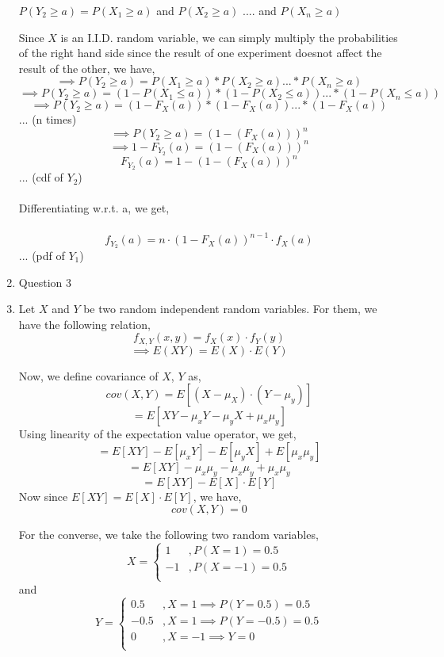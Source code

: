 \documentclass[11pt]{article}
\begin{document}
\begin{enumerate}
{		\begin{center}
			$P(Y_2 \geq a) = P(X_1 \geq a) $ and $ P(X_2 \geq a)$ .... and $P(X_n \geq a)$
		\end{center}

		Since $X$ is an I.I.D. random variable, we can simply multiply the probabilities of the right hand side since the result of one experiment doesnot affect the result of the other, we have, \\

		$$\implies P(Y_2 \geq a) = P(X_1 \geq a)*P(X_2 \geq a) ... *P(X_n \geq a)$$
		$$\implies P(Y_2 \geq a) = (1-P(X_1 \leq a))*(1-P(X_2 \leq a)) ... *(1-P(X_n \leq a))$$
		$$\implies P(Y_2 \geq a) = (1-F_X{(a)})*(1-F_X{(a)}) ... * (1-F_X{(a)})$$ \hfill{... (n times)} \\
		$$\implies P(Y_2 \geq a) = (1-{(F_X(a))})^n$$
		$$\implies 1- F_{Y_2}(a) = (1-{(F_X(a))})^n$$
		$$F_{Y_2}(a) = 1 - (1-{(F_X(a))})^n $$ \hfill{... (cdf of $Y_2$)} \\
		\\Differentiating w.r.t. a, we get, \\ \\
		$$f_{Y_2}(a) = n\cdot (1-F_{X}(a))^{n-1}\cdot f_X(a)$$ \hfill{... (pdf of $Y_1$)} \\
	}

	\item{
	Question 3
	}	

	\item{
		Let $X$ and $Y$ be two random independent random variables. For them, we have the following relation,
		$$f_{X,Y}(x,y) = f_X(x)\cdot f_Y(y)$$
		$$\implies E(XY) = E(X)\cdot E(Y)  $$

		Now, we define covariance of $X$, $Y$ as, 
		$$ cov(X,Y) = E[(X-\mu_X)\cdot(Y-\mu_y)] $$
		$$ = E[XY - \mu_xY - \mu_yX + \mu_x\mu_y]$$
		Using linearity of the expectation value operator, we get,
		$$ = E[XY] - E[\mu_xY] - E[\mu_yX] + E[\mu_x\mu_y]$$
		$$ = E[XY] - \mu_x\mu_y - \mu_x\mu_y + \mu_x\mu_y$$
		$$ = E[XY] - E[X]\cdot E[Y] $$
		Now since $E[XY] = E[X]\cdot E[Y]$, we have,
		$$cov(X,Y) = 0 $$

		For the converse, we take the following two random variables,
		\[X =  \begin{cases} 
		      1 &  ,P(X=1) = 0.5 \\
		      -1 &  ,P(X=-1) = 0.5\\
		   \end{cases}
		\]
		and
		\[Y =  \begin{cases} 
		      0.5 & ,X=1 \implies P(Y=0.5)=0.5 \\
		      -0.5 & ,X=1 \implies P(Y=-0.5)=0.5  \\
		      0 & ,X = -1 \implies Y=0 \\
		   \end{cases}
		\]

}
\end{enumerate}
\end{document}

